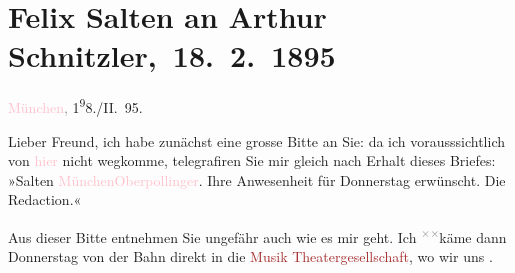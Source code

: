 

\renewcommand{\erwaehntePersonen}{Personen: Hermann Bahr, Richard Beer-Hofmann, Otto Brahm, Julius von Gans-Ludassy, Hugo von Hofmannsthal, Maria Charlotte Lamberg, Charlotte Pohl-Glas}
\renewcommand{\erwaehnteInstitutionen}{Institutionen: Deutsches Theater Berlin, Wiener Musik- und Theatergesellschaft}
\renewcommand{\erwaehnteOrte}{Orte: Hotel Oberpollinger, München, Volkstheater, Wien}
\renewcommand{\erwaehnteWerke}{Werke: Adele Sandrock, Die Zeit. Wiener Wochenschrift, Liebelei. Schauspiel in drei Akten}
\section[ Felix Salten an Arthur Schnitzler, 18. 2. 1895]{Felix Salten an Arthur Schnitzler, 18. 2. 1895}
\nopagebreak{}
\rehead{ }\normalsize\beginnumbering{}
\toendnotes[C]{\smallbreak\pagebreak[2]}
\toendnotes[C]{\smallbreak}
\pstart
           \raggedleft{}{\pb}\textcolor{pink}{München}{}\ledrightnote{\textcolor{pink}{München}}\textcolor{gray}{,}{ }1\substVorne{}\textsuperscript{9}\substDazwischen{}8\substHinten{}./II. 95.\pend
           
\pstart
           Lieber Freund, ich habe zunächst eine grosse Bitte an
               Sie: da ich vorausssichtlich von \textcolor{pink}{hier}{}\ledrightnote{{$\rightarrow$}\textcolor{pink}{München}} nicht wegkomme, telegrafiren Sie mir gleich nach Erhalt dieses Briefes:
               »Salten \textcolor{pink}{München}{}\ledrightnote{\textcolor{pink}{München}}{ }\textcolor{pink}{Oberpollinger}{}\ledrightnote{\textcolor{pink}{Hotel Oberpollinger}}. Ihre Anwesenheit für Donnerstag erwünscht. Die Redaction.«\pend
           
\pstart
           Aus dieser Bitte entnehmen Sie ungefähr auch wie es mir geht. Ich \substVorne{}\textsuperscript{\textcolor{gray}{×}\-\textcolor{gray}{×}}\substDazwischen{}kä\substHinten{}me dann Donnerstag von der Bahn direkt in die
                  \textcolor{brown}{Musik {\kaufmannsund}
                  Theatergesellschaft}{}\ledrightnote{\textcolor{brown}{Wiener Musik- und Theatergesellschaft}}, wo wir uns \label{K_L03152-1v}\label{K_L03152-1h}.\pend
           
